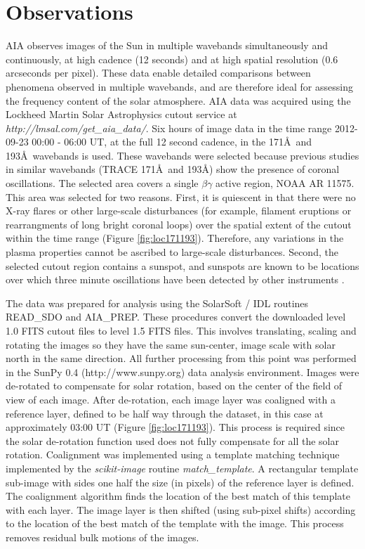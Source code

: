 \documentclass[onecolumn]{emulateapj}
\newcommand{\BF}{ }
\begin{document}
\section{Observations}\label{sec:obs}
{\BF AIA} observes images of the Sun in multiple wavebands
simultaneously and continuously, at high cadence (12 seconds) and at
high spatial resolution (0.6 arcseconds per pixel).  These data enable
detailed comparisons between phenomena observed in multiple wavebands,
and are therefore ideal for assessing the frequency content of the
solar atmosphere.  {\BF AIA} data was acquired using the Lockheed Martin
Solar Astrophysics cutout service at {\it
  http://lmsal.com/get\_aia\_data/}.  Six hours of image data in the
time range 2012-09-23 00:00 - 06:00 UT, at the full 12 second cadence,
in the 171\AA\ and 193\AA\ wavebands is used.  These wavebands were
selected because previous studies in similar wavebands (TRACE
171\AA\ and 193\AA) show the presence of coronal oscillations.  {\BF
  The selected area covers a single $\beta\gamma$ active region, NOAA
  AR 11575}.  This area was selected for two reasons.  First, it is
quiescent in that there were no X-ray flares or other large-scale
disturbances (for example, filament eruptions or rearrangments of long
bright coronal loops) over the spatial extent of the cutout within the
time range (Figure \ref{fig:loc171193}).  Therefore, any variations in
the plasma properties cannot be ascribed to large-scale disturbances.
Second, the selected cutout region contains a sunspot, and sunspots
are known to be locations over which three minute oscillations have
been detected by other instruments \citep{2002A&A...387L..13D}.

The data was prepared for analysis using the SolarSoft / IDL routines
READ\_SDO and AIA\_PREP.  These procedures convert the downloaded
level 1.0 FITS cutout files to level 1.5 FITS files.  This involves
translating, scaling and rotating the images so they have the same
sun-center, image scale with solar north in the same direction.  All
further processing from this point was performed in the SunPy 0.4
(http://www.sunpy.org) data analysis environment.  Images were
de-rotated to compensate for solar rotation, based on the center of
the field of view of each image.  After de-rotation, each image layer
was coaligned with a reference layer, defined to be half way through
the dataset, in this case at approximately 03:00 UT (Figure
\ref{fig:loc171193}).  This process is required since the solar
de-rotation function used does not fully compensate for all the solar
rotation. {\BF Coalignment was implemented using a template matching
  technique \citep{lewis1995fast} implemented by the {\it
    scikit-image} \citep{Vanderwalt2014} routine {\it
    match\_template}.  A rectangular template sub-image with sides one
  half the size (in pixels) of the reference layer is defined.  The
  coalignment algorithm finds the location of the best match of this
  template with each layer.  The image layer is then shifted (using
  sub-pixel shifts) according to the location of the best match of the
  template with the image.  This process removes residual bulk motions
  of the images.}
\end{document}
